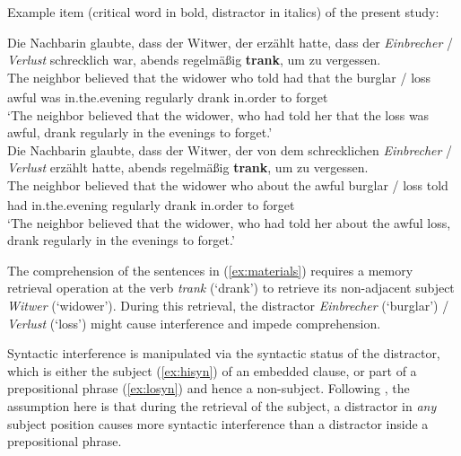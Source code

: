 \documentclass[a4paper, man, floatsintext]{apa7}
\begin{document}
\begin{exe}  
\ex \label{ex:materials} Example item (critical word in bold, distractor in italics) of the present study:
    \begin{xlist}   
    \label{ex:hisyn} 
    \gll Die  Nachbarin glaubte,	dass	der Witwer,  der  erzählt hatte, dass der \textit{Einbrecher} / \textit{Verlust}  schrecklich war, abends regelmäßig \textbf{trank}, um zu vergessen.\\ 
    The\textsubscript{} neighbor\textsubscript{} believed that the widower who told had that the burglar / loss awful was in.the.evening regularly drank in.order to forget \\
    \trans `The neighbor believed that the widower, who had told her that the loss was awful, drank regularly in the evenings to forget.' \\
    
    \label{ex:losyn} 
    \gll Die  Nachbarin glaubte, dass der Witwer,  der  von    dem schrecklichen \textit{Einbrecher} / \textit{Verlust} erzählt hatte, abends regelmäßig \textbf{trank}, um zu vergessen. \\ 
    The\textsubscript{} neighbor\textsubscript{} believed that the widower who about the awful burglar / loss told had in.the.evening regularly drank in.order to forget\\
    \trans `The neighbor believed that the widower, who had told her about the awful loss, drank regularly in the evenings to forget.'  \\
    \end{xlist}
\end{exe}

The comprehension of the sentences in (\ref{ex:materials}) requires a memory retrieval operation at the verb \textit{trank} (`drank') to retrieve its non-adjacent subject \textit{Witwer} (`widower'). During this retrieval, the distractor \textit{Einbrecher} (`burglar') / \textit{Verlust} (`loss') might cause interference and impede comprehension. 

Syntactic interference is manipulated via the syntactic status of the distractor, which is either the subject (\ref{ex:hisyn}) of an embedded clause, or part of a prepositional phrase (\ref{ex:losyn}) and hence a non-subject. Following \textcite{vandyke07}, the assumption here is that  during the retrieval of the subject, a distractor in \emph{any} subject position causes more syntactic interference than a distractor inside a prepositional phrase. 
\end{document}
